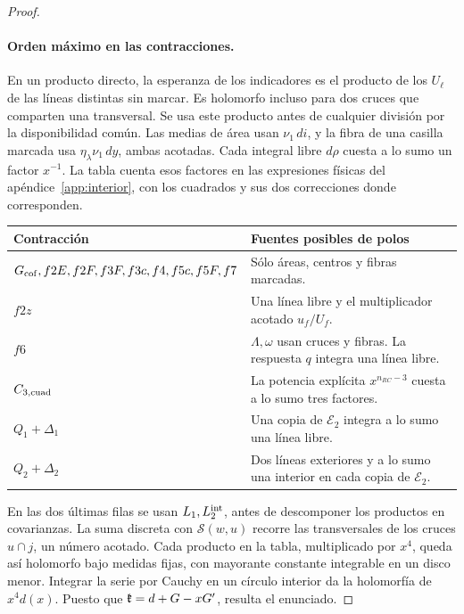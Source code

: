 \begin{proof}
\paragraph{Orden máximo en las contracciones.}
En un producto directo, la esperanza de los indicadores es el producto de los \(U_\ell\)
de las líneas distintas sin marcar. Es holomorfo incluso para dos cruces que comparten una
transversal. Se usa este producto antes de cualquier división por la disponibilidad común.
Las medias de área usan \(\nu_1\,di\), y la fibra de una casilla marcada usa
\(\eta_\lambda\nu_1\,dy\), ambas acotadas. Cada integral libre \(d\rho\) cuesta a lo sumo
un factor \(x^{-1}\). La tabla cuenta esos factores en las expresiones físicas del
apéndice~\ref{app:interior}, con los cuadrados y sus dos correcciones donde corresponden.
\begin{center}\small
\begin{tabular}{@{}lp{.54\linewidth}@{}}\toprule
Contracción & Fuentes posibles de polos\\ \midrule
\(G_{\rm cof}, f2E, f2F,f3F,f3c,f4,f5c,f5F,f7\) & Sólo áreas, centros y fibras marcadas.\\
\(f2z\) & Una línea libre y el multiplicador acotado \(u_f/U_f\).\\
\(f6\) & \(\Lambda,\omega\) usan cruces y fibras. La respuesta \(q\) integra una línea libre.\\
\(C_{3,\rm cuad}\) & La potencia explícita \(x^{n_{RC}-3}\) cuesta a lo sumo tres factores.\\
\(Q_1+\Delta_1\) & Una copia de \(\mathcal E_2\) integra a lo sumo una línea libre.\\
\(Q_2+\Delta_2\) & Dos líneas exteriores y a lo sumo una interior en cada copia de
 \(\mathcal E_2\).\\ \bottomrule
\end{tabular}
\end{center}
En las dos últimas filas se usan \(L_1,L_2^{\rm int}\), antes de descomponer los
productos en covarianzas. La suma discreta con \(\mathcal S(w,u)\) recorre las
transversales de los cruces \(u\cap j\), un número acotado. Cada producto en la tabla,
multiplicado por \(x^4\), queda así holomorfo bajo medidas fijas, con mayorante constante
integrable en un disco menor. Integrar la serie por Cauchy en un círculo interior
da la holomorfía de \(x^4d(x)\). Puesto que \(\mathfrak{k}=d+G-xG'\), resulta el enunciado.
\end{proof}
